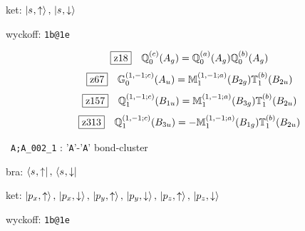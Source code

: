 \documentclass[fleqn,10pt,landscape]{jsarticle}
\begin{document}
\noindent\quad * ket: $\ket{s_{},\uparrow},\, \ket{s_{},\downarrow}$

\noindent\quad * wyckoff: \texttt{1b@1e}

\begin{dmath*}
\hspace*{3mm}\fbox{z18}\quad \mathbb{Q}_{0}^{(c)}(A_{g})=\mathbb{Q}_{0}^{(a)}(A_{g}) \mathbb{Q}_{0}^{(b)}(A_{g})
\end{dmath*}
\begin{dmath*}
\hspace*{3mm}\fbox{z67}\quad \mathbb{G}_{0}^{(1,-1;c)}(A_{u})=\mathbb{M}_{1}^{(1,-1;a)}(B_{2g}) \mathbb{T}_{1}^{(b)}(B_{2u})
\end{dmath*}
\begin{dmath*}
\hspace*{3mm}\fbox{z157}\quad \mathbb{Q}_{1}^{(1,-1;c)}(B_{1u})=\mathbb{M}_{1}^{(1,-1;a)}(B_{3g}) \mathbb{T}_{1}^{(b)}(B_{2u})
\end{dmath*}
\begin{dmath*}
\hspace*{3mm}\fbox{z313}\quad \mathbb{Q}_{1}^{(1,-1;c)}(B_{3u})=- \mathbb{M}_{1}^{(1,-1;a)}(B_{1g}) \mathbb{T}_{1}^{(b)}(B_{2u})
\end{dmath*}
\vspace{5mm}

\noindent\textbullet\, \texttt{A;A_002_1} : '\texttt{A}'-'\texttt{A}' bond-cluster

\noindent\quad * bra: $\bra{s_{},\uparrow},\, \bra{s_{},\downarrow}$

\noindent\quad * ket: $\ket{p_{x},\uparrow},\, \ket{p_{x},\downarrow},\, \ket{p_{y},\uparrow},\, \ket{p_{y},\downarrow},\, \ket{p_{z},\uparrow},\, \ket{p_{z},\downarrow}$

\noindent\quad * wyckoff: \texttt{1b@1e}
\end{document}
